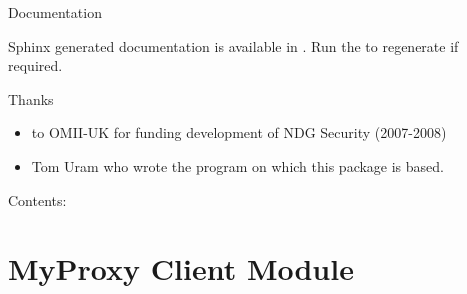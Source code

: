 \documentclass[letterpaper,10pt,english]{sphinxmanual}
\begin{document}
Documentation

Sphinx generated documentation is available in .  Run the
 to regenerate if required.

Thanks
\begin{itemize}
\item {} 
to OMII-UK for funding development of NDG Security (2007-2008)

\item {} 
Tom Uram who wrote the  program on which this package is
based.

\end{itemize}

Contents:


\section{MyProxy Client Module}
\label{client:myproxy-client-module}\label{client::doc}
\end{document}
